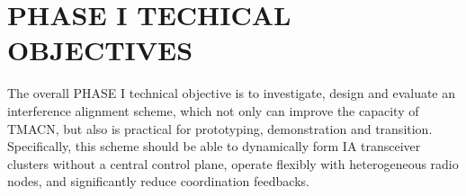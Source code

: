 \documentclass[letterpaper,11pt]{article}
\begin{document}

\section{PHASE I TECHICAL OBJECTIVES}


The overall PHASE I technical objective is to investigate, design and evaluate an interference alignment scheme, which not only can improve the capacity of TMACN, but also is practical for prototyping, demonstration and transition. Specifically, this scheme should be able to dynamically form IA transceiver clusters without a central control plane,  operate flexibly with heterogeneous radio nodes, and significantly reduce coordination feedbacks. 


\end{document}
